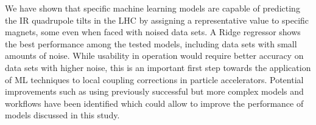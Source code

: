 
We have shown that specific machine learning models are capable of predicting the IR quadrupole tilts in the LHC by assigning a representative value to specific magnets, some even when faced with noised data sets.
A Ridge regressor shows the best performance among the tested models, including data sets with small amounts of noise.
While usability in operation would require better accuracy on data sets with higher noise, this is an important first step towards the application of ML techniques to local coupling corrections in particle accelerators.
Potential improvements such as using previously successful but more complex models and workflows have been identified which could allow to improve the performance of models discussed in this study.